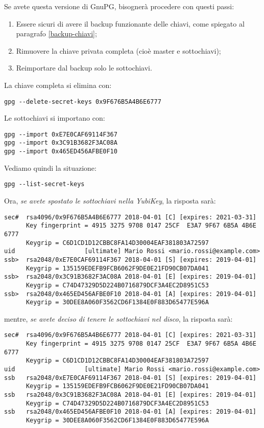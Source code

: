Se avete questa versione di GnuPG, bisognerà procedere con questi passi:

\begin{enumerate}
   \item Essere sicuri di avere il backup funzionante delle chiavi, come
   spiegato al paragrafo \vref{backup-chiavi};
   \item Rimuovere la chiave privata completa (cioè master e sottochiavi);
   \item Reimportare dal backup solo le sottochiavi.
\end{enumerate}

La chiave completa si elimina con:

\begin{lstlisting}
gpg --delete-secret-keys 0x9F676B5A4B6E6777
\end{lstlisting}

Le sottochiavi si importano con:

\begin{lstlisting}
gpg --import 0xE7E0CAF69114F367
gpg --import 0x3C91B3682F3AC08A
gpg --import 0x465ED456AFBE0F10
\end{lstlisting}

Vediamo quindi la situazione:

\begin{lstlisting}
gpg --list-secret-keys
\end{lstlisting}

Ora, \emph{se avete spostato le sottochiavi nella YubiKey}, la risposta sarà:

\begin{lstlisting}
sec#  rsa4096/0x9F676B5A4B6E6777 2018-04-01 [C] [expires: 2021-03-31]
      Key fingerprint = 4915 3275 9708 0147 25CF  E3A7 9F67 6B5A 4B6E 6777
      Keygrip = C6D1CD1D12CBBC8FA14D30004EAF381803A72597
uid                   [ultimate] Mario Rossi <mario.rossi@example.com>
ssb>  rsa2048/0xE7E0CAF69114F367 2018-04-01 [S] [expires: 2019-04-01]
      Keygrip = 135159EDEFB9FCB6062F9DE0E21FD90CB07DA041
ssb>  rsa2048/0x3C91B3682F3AC08A 2018-04-01 [E] [expires: 2019-04-01]
      Keygrip = C74D47329D5D224B0716879DCF3A4EC2D8951C53
ssb>  rsa2048/0x465ED456AFBE0F10 2018-04-01 [A] [expires: 2019-04-01]
      Keygrip = 30DEE8A060F3562CD6F1384E0F883D65477E596A
\end{lstlisting}

mentre, \emph{se avete deciso di tenere le sottochiavi nel disco}, la risposta
sarà:

\begin{lstlisting}
sec#  rsa4096/0x9F676B5A4B6E6777 2018-04-01 [C] [expires: 2021-03-31]
      Key fingerprint = 4915 3275 9708 0147 25CF  E3A7 9F67 6B5A 4B6E 6777
      Keygrip = C6D1CD1D12CBBC8FA14D30004EAF381803A72597
uid                   [ultimate] Mario Rossi <mario.rossi@example.com>
ssb   rsa2048/0xE7E0CAF69114F367 2018-04-01 [S] [expires: 2019-04-01]
      Keygrip = 135159EDEFB9FCB6062F9DE0E21FD90CB07DA041
ssb   rsa2048/0x3C91B3682F3AC08A 2018-04-01 [E] [expires: 2019-04-01]
      Keygrip = C74D47329D5D224B0716879DCF3A4EC2D8951C53
ssb   rsa2048/0x465ED456AFBE0F10 2018-04-01 [A] [expires: 2019-04-01]
      Keygrip = 30DEE8A060F3562CD6F1384E0F883D65477E596A
\end{lstlisting}
